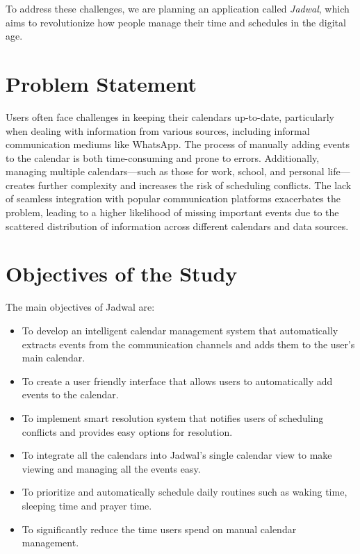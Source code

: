 \documentclass[12pt,a4paper]{report}
\begin{document}
To address these challenges, we are planning an application called \textit{Jadwal}, which aims to revolutionize how people manage their time and schedules in the digital age.

\section{Problem Statement}

Users often face challenges in keeping their calendars up-to-date, particularly when dealing with information from various sources, including informal communication mediums like WhatsApp. The process of manually adding events to the calendar is both time-consuming and prone to errors. Additionally, managing multiple calendars—such as those for work, school, and personal life—creates further complexity and increases the risk of scheduling conflicts. The lack of seamless integration with popular communication platforms exacerbates the problem, leading to a higher likelihood of missing important events due to the scattered distribution of information across different calendars and data sources.

\section{Objectives of the Study}

The main objectives of Jadwal are:

\begin{itemize}
    \item To develop an intelligent calendar management system that automatically extracts events from the communication channels and adds them to the user's main calendar.
    \item To create a user friendly interface that allows users to automatically add events to the calendar.
    \item To implement smart resolution system that notifies users of scheduling conflicts and provides easy options for resolution.
    \item To integrate all the calendars into Jadwal's single calendar view to make viewing and managing all the events easy.
    \item To prioritize and automatically schedule daily routines such as waking time, sleeping time and prayer time.
    \item To significantly reduce the time users spend on manual calendar management.
\end{itemize}
\end{document}
